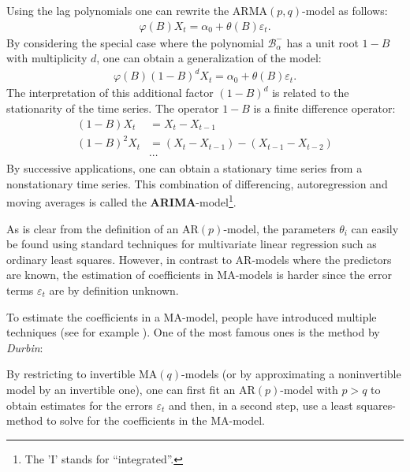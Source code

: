     Using the lag polynomials one can rewrite the $\mathrm{ARMA}(p,q)$-model as follows:
    \begin{gather}
        \varphi(B)X_t = \alpha_0 + \theta(B)\varepsilon_t.
    \end{gather}
    By considering the special case where the polynomial $\mathcal{B}^-_\alpha$ has a unit root $1-B$ with multiplicity $d$, one can obtain a generalization of the model:
    \begin{gather}
        \varphi(B)(1-B)^dX_t = \alpha_0 + \theta(B)\varepsilon_t.
    \end{gather}
    The interpretation of this additional factor $(1-B)^d$ is related to the stationarity of the time series. The operator $1-B$ is a finite difference operator:
    \begin{align*}
        (1-B)X_t &= X_t - X_{t-1}\\
        (1-B)^2X_t &= (X_t-X_{t-1}) - (X_{t-1}-X_{t-2})\\
        &\cdots
    \end{align*}
    By successive applications, one can obtain a stationary time series from a nonstationary time series. This combination of differencing, autoregression and moving averages is called the \textbf{ARIMA}-model\footnote{The 'I' stands for ``integrated''.}.


    \begin{remark}
        As is clear from the definition of an $\mathrm{AR}(p)$-model, the parameters $\theta_i$ can easily be found using standard techniques for multivariate linear regression such as ordinary least squares. However, in contrast to AR-models where the predictors are known, the estimation of coefficients in MA-models is harder since the error terms $\varepsilon_t$ are by definition unknown.
    \end{remark}
    To estimate the coefficients in a MA-model, people have introduced multiple techniques (see for example \cite{MA_fit}). One of the most famous ones is the method by \textit{Durbin}:
    \begin{method}[Durbin]
        By restricting to invertible $\mathrm{MA}(q)$-models (or by approximating a noninvertible model by an invertible one), one can first fit an $\mathrm{AR}(p)$-model with $p>q$ to obtain estimates for the errors $\varepsilon_t$ and then, in a second step, use a least squares-method to solve for the coefficients in the MA-model.
    \end{method}

